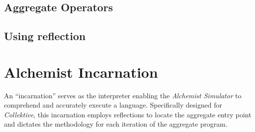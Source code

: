 \subsection{Aggregate Operators}
\label{subsec:aggregate-operators}


\subsection{Using reflection}
\label{subsec:using-reflection}



\section{Alchemist Incarnation}
\label{sec:incarnation}
An ``incarnation'' serves as the interpreter enabling the \emph{Alchemist Simulator} to comprehend and accurately execute a language.
Specifically designed for \emph{Collektive}, this incarnation employs reflections to locate the aggregate entry point and dictates
the methodology for each iteration of the aggregate program.

